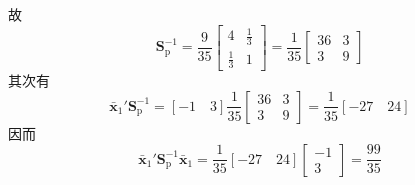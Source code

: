 故
\[
\mathbf{S}_{\mathrm{p}}^{-1}=\frac{9}{35}\begin{bmatrix}4&\frac{1}{3}\\[2pt]\frac{1}{3}&1\end{bmatrix}=\frac{1}{35}\begin{bmatrix}36&3\\3&9\end{bmatrix}
\]
其次有
\[
\bar{\mathbf{x}}_1'\mathbf{S}_{\mathrm{p}}^{-1}=[-1\quad 3]\frac{1}{35}\begin{bmatrix}36&3\\3&9\end{bmatrix}=\frac{1}{35}[-27\quad 24]
\]
因而
\[
\bar{\mathbf{x}}_1'\mathbf{S}_{\mathrm{p}}^{-1}\bar{\mathbf{x}}_1=\frac{1}{35}[-27\quad 24]\begin{bmatrix}-1\\3\end{bmatrix}=\frac{99}{35}
\]
